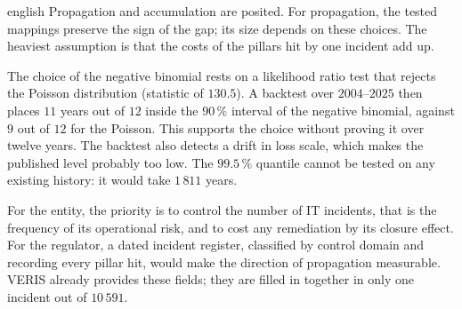 \begin{otherlanguage*}{english}
Propagation and accumulation are posited. For propagation, the tested mappings preserve the sign of the gap; its size depends on these choices. The heaviest assumption is that the costs of the pillars hit
by one incident add up.

The choice of the negative binomial rests on a likelihood ratio test that rejects the Poisson
distribution (statistic of $130.5$). A backtest over $2004$--$2025$ then places $11$ years out of
$12$ inside the $90\,\%$ interval of the negative binomial, against $9$ out of $12$ for the Poisson.
This supports the choice without proving it over twelve years. The backtest also detects a drift in loss scale, which makes the published level probably too low. The $99.5\,\%$ quantile cannot be tested on any existing history: it would take $1\,811$ years.

For the entity, the priority is to control the number of IT incidents, that is the frequency of its
operational risk, and to cost any remediation by its closure effect. For the regulator, a dated
incident register, classified by control domain and recording every pillar hit, would make the
direction of propagation measurable. VERIS already provides these fields; they are filled in together in only one incident out of
$10\,591$.
\end{otherlanguage*}
